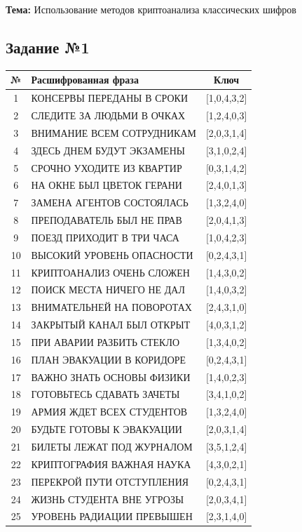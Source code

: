 \documentclass[a4paper,12pt]{article}
\begin{document}
\noindent\textbf{Тема:} Использование методов криптоанализа
классических шифров\\

\subsection*{Задание №1}

\begin{center}
  \begin{tabular}{|c|p{9cm}|c|}
    \hline
    № & Расшифрованная фраза & Ключ \\
    \hline
    1 & КОНСЕРВЫ ПЕРЕДАНЫ В СРОКИ & [1,0,4,3,2] \\
    \hline
    2 & СЛЕДИТЕ ЗА ЛЮДЬМИ В ОЧКАХ & [1,2,4,0,3] \\
    \hline
    3 & ВНИМАНИЕ ВСЕМ СОТРУДНИКАМ & [2,0,3,1,4] \\
    \hline
    4 & ЗДЕСЬ ДНЕМ БУДУТ ЭКЗАМЕНЫ & [3,1,0,2,4] \\
    \hline
    5 & СРОЧНО УХОДИТЕ ИЗ КВАРТИР & [0,3,1,4,2] \\
    \hline
    6 & НА ОКНЕ БЫЛ ЦВЕТОК ГЕРАНИ & [2,4,0,1,3] \\
    \hline
    7 & ЗАМЕНА АГЕНТОВ СОСТОЯЛАСЬ & [1,3,2,4,0] \\
    \hline
    8 & ПРЕПОДАВАТЕЛЬ БЫЛ НЕ ПРАВ & [2,0,4,1,3] \\
    \hline
    9 & ПОЕЗД ПРИХОДИТ В ТРИ ЧАСА & [1,0,4,2,3] \\
    \hline
    10 & ВЫСОКИЙ УРОВЕНЬ ОПАСНОСТИ & [0,2,4,3,1] \\
    \hline
    11 & КРИПТОАНАЛИЗ ОЧЕНЬ СЛОЖЕН & [1,4,3,0,2] \\
    \hline
    12 & ПОИСК МЕСТА НИЧЕГО НЕ ДАЛ & [1,4,0,3,2] \\
    \hline
    13 & ВНИМАТЕЛЬНЕЙ НА ПОВОРОТАХ & [2,4,3,1,0] \\
    \hline
    14 & ЗАКРЫТЫЙ КАНАЛ БЫЛ ОТКРЫТ & [4,0,3,1,2] \\
    \hline
    15 & ПРИ АВАРИИ РАЗБИТЬ СТЕКЛО & [1,3,4,0,2] \\
    \hline
    16 & ПЛАН ЭВАКУАЦИИ В КОРИДОРЕ & [0,2,4,3,1] \\
    \hline
    17 & ВАЖНО ЗНАТЬ ОСНОВЫ ФИЗИКИ & [1,4,0,2,3] \\
    \hline
    18 & ГОТОВЬТЕСЬ СДАВАТЬ ЗАЧЕТЫ & [3,4,1,0,2] \\
    \hline
    19 & АРМИЯ ЖДЕТ ВСЕХ СТУДЕНТОВ & [1,3,2,4,0] \\
    \hline
    20 & БУДЬТЕ ГОТОВЫ К ЭВАКУАЦИИ & [2,0,3,1,4] \\
    \hline
    21 & БИЛЕТЫ ЛЕЖАТ ПОД ЖУРНАЛОМ & [3,5,1,2,4] \\
    \hline
    22 & КРИПТОГРАФИЯ ВАЖНАЯ НАУКА & [4,3,0,2,1] \\
    \hline
    23 & ПЕРЕКРОЙ ПУТИ ОТСТУПЛЕНИЯ & [0,2,4,3,1] \\
    \hline
    24 & ЖИЗНЬ СТУДЕНТА ВНЕ УГРОЗЫ & [2,0,3,4,1] \\
    \hline
    25 & УРОВЕНЬ РАДИАЦИИ ПРЕВЫШЕН & [2,3,1,4,0] \\
    \hline
  \end{tabular}
\end{center}
\end{document}
